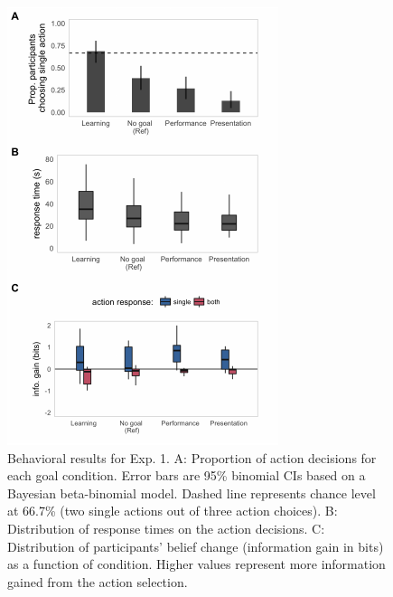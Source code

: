 \documentclass[10pt, letterpaper]{article}
\newenvironment{CodeChunk}{}{}
\begin{document}
\begin{CodeChunk}
\begin{figure}[H]

{\centering \includegraphics[width=0.86\linewidth]{figs/e1_behav_results_plot-1} 

}

\caption[Behavioral results for Exp]{Behavioral results for Exp. 1. A: Proportion of action decisions for each goal condition. Error bars are 95\% binomial CIs based on a Bayesian beta-binomial model. Dashed line represents chance level at 66.7\% (two single actions out of three action choices). B: Distribution of response times on the action decisions. C: Distribution of participants' belief change (information gain in bits) as a function of condition. Higher values represent more information gained from the action selection.}\label{fig:e1_behav_results_plot}
\end{figure}
\end{CodeChunk}
\end{document}
